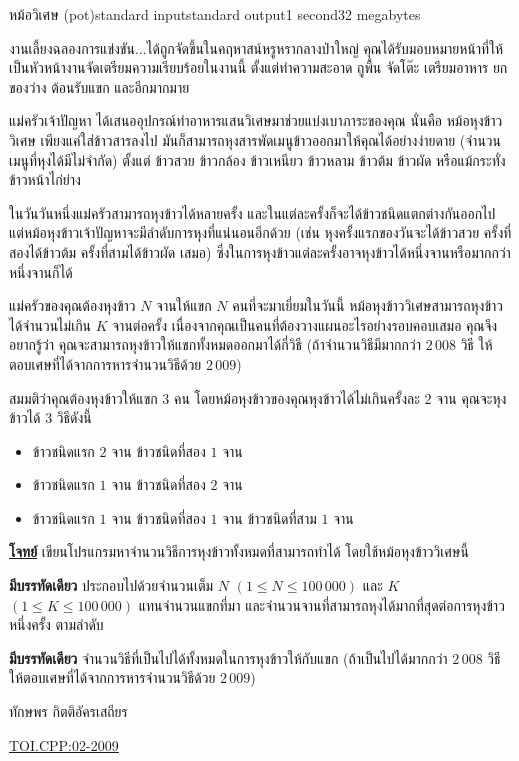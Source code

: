 \documentclass[11pt,a4paper]{article}
\begin{document}
\begin{problem}{หม้อวิเศษ (pot)}{standard input}{standard output}{1 second}{32 megabytes}

งานเลี้ยงฉลองการแข่งขัน...ได้ถูกจัดขึ้นในคฤหาสน์หรูหรากลางป่าใหญ่ คุณได้รับมอบหมายหน้าที่ให้เป็นหัวหน้างานจัดเตรียมความเรียบร้อยในงานนี้ ตั้งแต่ทำความสะอาด ถูพื้น จัดโต๊ะ เตรียมอาหาร ยกของว่าง ต้อนรับแขก และอีกมากมาย

แม่ครัวเจ้าปัญหา ได้เสนออุปกรณ์ทำอาหารแสนวิเศษมาช่วยแบ่งเบาภาระของคุณ นั่นคือ หม้อหุงข้าววิเศษ เพียงแค่ใส่ข้าวสารลงไป มันก็สามารถหุงสารพัดเมนูข้าวออกมาให้คุณได้อย่างง่ายดาย (จำนวนเมนูที่หุงได้มีไม่จำกัด) ตั้งแต่ ข้าวสวย ข้าวกล้อง ข้าวเหนียว ข้าวหลาม ข้าวต้ม ข้าวผัด  หรือแม้กระทั่งข้าวหน้าไก่ย่าง 

      ในวันวันหนึ่งแม่ครัวสามารถหุงข้าวได้หลายครั้ง และในแต่ละครั้งก็จะได้ข้าวชนิดแตกต่างกันออกไป  แต่หม้อหุงข้าวเจ้าปัญหาจะมีลำดับการหุงที่แน่นอนอีกด้วย (เช่น หุงครั้งแรกของวันจะได้ข้าวสวย ครั้งที่สองได้ข้าวต้ม ครั้งที่สามได้ข้าวผัด เสมอ) ซึ่งในการหุงข้าวแต่ละครั้งอาจหุงข้าวได้หนึ่งจานหรือมากกว่าหนึ่งจานก็ได้

      แม่ครัวของคุณต้องหุงข้าว $N$ จานให้แขก $N$ คนที่จะมาเยี่ยมในวันนี้ หม้อหุงข้าววิเศษสามารถหุงข้าวได้จำนวนไม่เกิน $K$ จานต่อครั้ง เนื่องจากคุณเป็นคนที่ต้องวางแผนอะไรอย่างรอบคอบเสมอ คุณจึงอยากรู้ว่า คุณจะสามารถหุงข้าวให้แขกทั้งหมดออกมาได้กี่วิธี (ถ้าจำนวนวิธีมีมากกว่า $2\,008$ วิธี ให้ตอบเศษที่ได้จากการหารจำนวนวิธีด้วย $2\,009$)

      สมมติว่าคุณต้องหุงข้าวให้แขก $3$ คน โดยหม้อหุงข้าวของคุณหุงข้าวได้ไม่เกินครั้งละ $2$ จาน คุณจะหุงข้าวได้ $3$ วิธีดังนี้

\begin{itemize}
\item ข้าวชนิดแรก $2$ จาน ข้าวชนิดที่สอง $1$ จาน 
\item ข้าวชนิดแรก $1$ จาน ข้าวชนิดที่สอง $2$ จาน    
\item ข้าวชนิดแรก $1$ จาน ข้าวชนิดที่สอง $1$ จาน ข้าวชนิดที่สาม $1$ จาน
\end{itemize}

\bigskip
\underline{\textbf{โจทย์}}   เขียนโปรแกรมหาจำนวนวิธีการหุงข้าวทั้งหมดที่สามารถทำได้ โดยใช้หม้อหุงข้าววิเศษนี้

\InputFile

\textbf{มีบรรทัดเดียว} ประกอบไปด้วยจำนวนเต็ม $N$ $(1 \leq N \leq 100\,000)$ และ $K$ $(1 \leq K \leq 100\,000)$ แทนจำนวนแขกที่มา และจำนวนจานที่สามารถหุงได้มากที่สุดต่อการหุงข้าวหนึ่งครั้ง ตามลำดับ


\OutputFile

\textbf{มีบรรทัดเดียว} จำนวนวิธีที่เป็นไปได้ทั้งหมดในการหุงข้าวให้กับแขก (ถ้าเป็นไปได้มากกว่า $2\,008$ วิธี ให้ตอบเศษที่ได้จากการหารจำนวนวิธีด้วย $2\,009$)

\Examples

\begin{example}
%
%
\end{example}


\Source

ทักษพร กิตติอัครเสถียร

\underline{\href{http://www.thailandoi.org/toi.c/02-2009}{TOI.CPP:02-2009}}

\end{problem}
\end{document}
